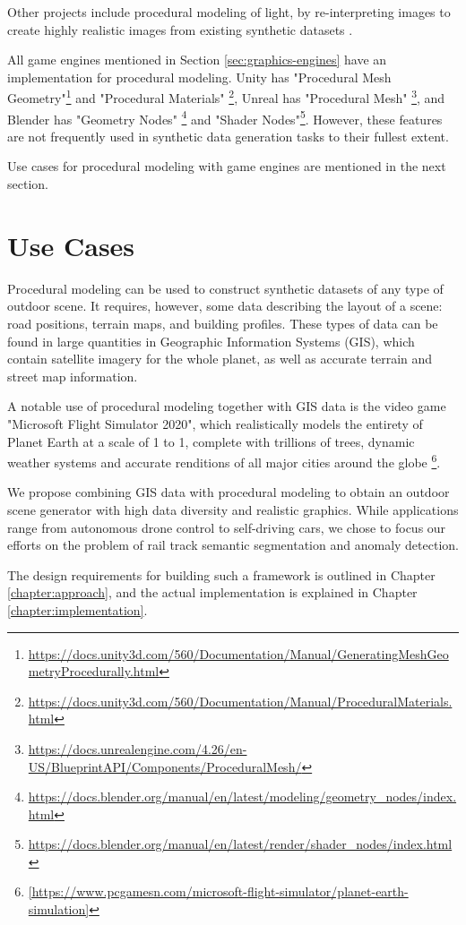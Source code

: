 Other projects include procedural modeling of light, by re-interpreting images to create highly realistic images from existing synthetic datasets \cite{tsirikoglou2017procedural,wrenninge2018synscapes}.

All game engines mentioned in Section \ref{sec:graphics-engines} have an implementation for procedural modeling. Unity has "Procedural Mesh Geometry"\footnote{\url{https://docs.unity3d.com/560/Documentation/Manual/GeneratingMeshGeometryProcedurally.html}} and "Procedural Materials" \footnote{\url{https://docs.unity3d.com/560/Documentation/Manual/ProceduralMaterials.html}}, Unreal has "Procedural Mesh" \footnote{\url{https://docs.unrealengine.com/4.26/en-US/BlueprintAPI/Components/ProceduralMesh/}}, and Blender has "Geometry Nodes" \footnote{\url{https://docs.blender.org/manual/en/latest/modeling/geometry_nodes/index.html}} and "Shader Nodes"\footnote{\url{https://docs.blender.org/manual/en/latest/render/shader_nodes/index.html}}. However, these features are not frequently used in synthetic data generation tasks to their fullest extent.

Use cases for procedural modeling with game engines are mentioned in the next section.

\section{Use Cases}
\label{sec:use-cases}

Procedural modeling can be used to construct synthetic datasets of any type of outdoor scene. It requires, however, some data describing the layout of a scene: road positions, terrain maps, and building profiles. These types of data can be found in large quantities in Geographic Information Systems (GIS), which contain satellite imagery for the whole planet, as well as accurate terrain and street map information.

A notable use of procedural modeling together with GIS data is the video game "Microsoft Flight Simulator 2020", which realistically models the entirety of Planet Earth at a scale of 1 to 1, complete with trillions of trees, dynamic weather systems and accurate renditions of all major cities around the globe \footnote{\ref{https://www.pcgamesn.com/microsoft-flight-simulator/planet-earth-simulation}}.

We propose combining GIS data with procedural modeling to obtain an outdoor scene generator with high data diversity and realistic graphics. While applications range from autonomous drone control to self-driving cars, we chose to focus our efforts on the problem of rail track semantic segmentation and anomaly detection.

The design requirements for building such a framework is outlined in Chapter \ref{chapter:approach}, and the actual implementation is explained in Chapter \ref{chapter:implementation}.
